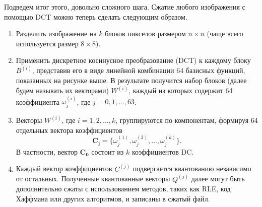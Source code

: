  Подведем итог этого, довольно сложного шага. Сжатие любого изображения с помощью DCT можно теперь сделать следующим образом.

    
    
    

 \begin{enumerate}
    \item Разделить изображение на $k$ блоков пикселов размером $n \times n$ (чаще всего используется размер $8 \times 8)$.
    \item Применить дискретное косинусное преобразование (DCT) к каждому блоку $B^{(i)}$, представив его в виде линейной комбинации
    64 базисных функций, показанных на рисунке выше. В результате получится набор блоков (далее будем называть их векторами) $W^{(i)}$,
    каждый из которых содержит 64 коэффициента $\omega^{(i)}_{j}$, где $j = 0, 1, \dots, 63$.
    \item Векторы $W^{(i)}$, где $i = 1, 2, \dots, k$, группируются по компонентам, формируя 64 отдельных вектора коэффициентов
    $$
    \mathbf{C_j} = \{ \omega^{(1)}_j, \omega^{(2)}_j, \dots, \omega^{(k)}_j \}.
    $$
    В частности, вектор $\mathbf{C_0}$ состоит из $k$ коэффициентов DC.
    \item Каждый вектор коэффициентов $C^{(j)}$ подвергается квантованию независимо от остальных. 
    Полученные квантованные векторы $Q^{(j)}$ далее могут быть дополнительно сжаты с использованием методов, 
    таких как RLE, код Хаффмана или других алгоритмов, и записаны в сжатый файл.
 \end{enumerate}



